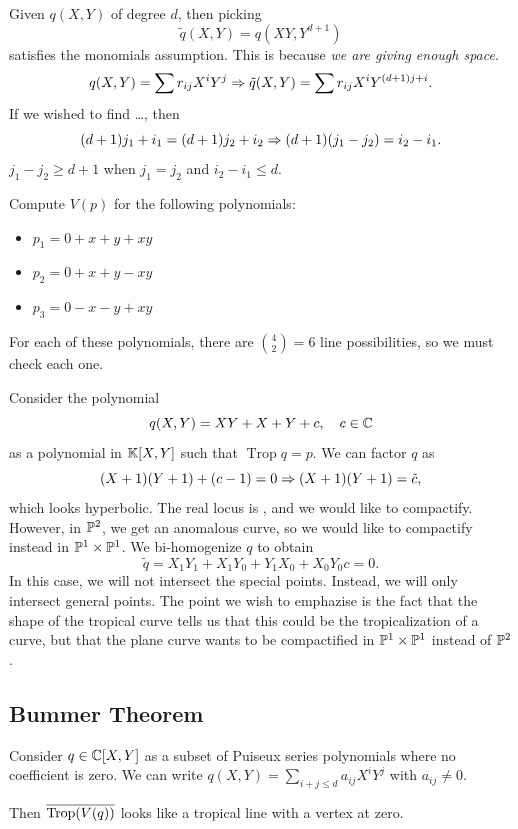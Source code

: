 \documentclass[12pt]{memoir}
\DeclareMathOperator{\Trop}{Trop}
\theoremstyle{definition}
\begin{document}
\begin{ptcb}
Given $q(X,Y)$ of degree $d$, then picking 
$$\tilde{q}(X,Y)=q(XY,Y^{d+1})$$
satisfies the monomials assumption. This is because \emph{we are giving enough space}.
$$q(X,Y)=\sum r_{ij}X^iY^j\Rightarrow \tilde{q}(X,Y)=\sum r_{ij}X^iY^{(d+1)j+i}.$$
If we wished to find \dots, then 
$$(d+1)j_1+i_1=(d+1)j_2+i_2\Rightarrow (d+1)(j_1-j_2)=i_2-i_1.$$
$j_1-j_2\geq d+1$ when $j_1=j_2$ and $i_2-i_1\leq d$.
\end{ptcb}

\begin{Ex}
    Compute $V(p)$ for the following polynomials:
    \begin{itemize}
        \item $p_1=0+x+y+xy$
        \item $p_2=0+x+y-xy$
        \item $p_3=0-x-y+xy$
    \end{itemize}
    For each of these polynomials, there are $\binom{4}{2}=6$ line possibilities, so we must check each one.
\end{Ex}

Consider the polynomial 
$$q(X,Y)=XY+X+Y+c,\quad c\in\mathbb{C}$$
as a polynomial in $\mathbb{K}[X,Y]$ such that $\Trop q=p$. We can factor $q$ as 
$$(X+1)(Y+1)+(c-1)=0\Rightarrow(X+1)(Y+1)=\tilde{c},$$
which looks hyperbolic. The real locus is , and we would like to compactify. However, in $\mathbb{P}^2$, we get an anomalous curve,  so we would like to compactify instead in $\mathbb{P}^1\times\mathbb{P}^1$.  We bi-homogenize $q$ to obtain 
$$\tilde{q}=X_1Y_1+X_1Y_0+Y_1X_0+X_0Y_0c=0.$$ 
In this case,  we will not intersect the special points. Instead, we will only intersect general points. The point we wish to emphazise is the fact that the shape of the tropical curve tells us that this could be the tropicalization of a curve, but that the plane curve wants to be compactified in $\mathbb{P}^1\times\mathbb{P}^1$ instead of $\mathbb{P}^2$.

\subsection{Bummer Theorem}

\begin{Th} 
    Consider $q\in\mathbb{C}[X,Y]$ as a subset of Puiseux series polynomials where no coefficient is zero. We can write $q(X,Y)=\sum_{i+j\leq d}a_{ij}X^iY^j$ with $a_{ij}\neq 0$.\par 
    Then $\ov{\Trop(V(q))}$ looks like a tropical line with a vertex at zero.
\end{Th}
\end{document}
